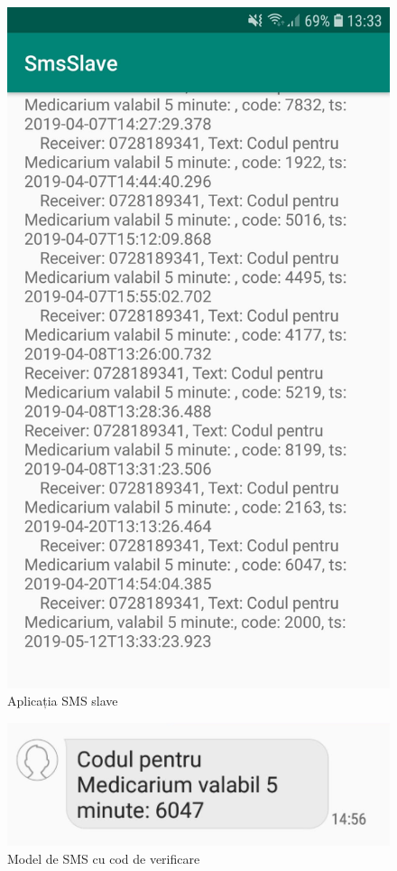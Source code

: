 \documentclass[12pt]{article}
\begin{document}
\begin{figure}[H]
\begin{minipage}[b]{0.4\textwidth}
    \includegraphics[width=\textwidth]{smsslave.jpg}
    \caption{Aplicația SMS slave}
\end{minipage}
\end{figure}

\begin{figure}[H]
\centering
\includegraphics{exsms.png}
\caption{Model de SMS cu cod de verificare}
\end{figure}
\end{document}
